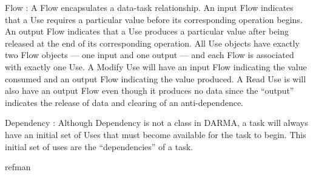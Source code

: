 \begin{compactdesc}
\item [Flow]: A Flow encapsulates a data-task relationship. 
An input Flow indicates that a Use requires a particular value before its corresponding operation begins.
An output Flow indicates that a Use produces a particular value after being released at the end of its corresponding operation.
All Use objects have exactly two Flow objects --- one input and one output ---
and each Flow is associated with exactly one Use.
A Modify Use will have an input Flow indicating the value consumed and an output Flow indicating the value produced.
A Read Use is will also have an output Flow even though it produces no data since the ``output'' indicates the release of data and clearing of an anti-dependence.
\item [Dependency]: Although Dependency is not a class in DARMA, a task will always have an initial set of Uses that must become
available for the task to begin.
This initial set of uses are the ``dependencies'' of a task.
\end{compactdesc} 

{refman}

